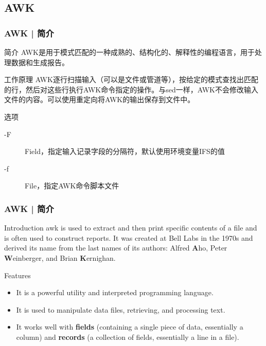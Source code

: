 \subsection{AWK}
\begin{frame}
  \frametitle{AWK | 简介}
  \begin{block}{简介}
    AWK是用于模式匹配的一种成熟的、结构化的、解释性的编程语言，用于处理数据和生成报告。
  \end{block}
  \pause
  \begin{block}{工作原理}
    AWK逐行扫描输入（可以是文件或管道等），按给定的模式查找出匹配的行，然后对这些行执行AWK命令指定的操作。与sed一样，AWK不会修改输入文件的内容。可以使用重定向将AWK的输出保存到文件中。
  \end{block}
  \pause
  \begin{block}{\alert{选项}}
    \begin{description}
      \item[-F] Field，指定输入记录字段的分隔符，默认使用环境变量IFS的值
      \item[-f] File，指定AWK命令脚本文件
    \end{description}
  \end{block}
\end{frame}

\begin{frame}
  \frametitle{AWK | 简介}
  \begin{block}{Introduction}
    awk is used to extract and then print specific contents of a file and is often used to construct reports. It was created at Bell Labs in the 1970s and derived its name from the last names of its authors: Alfred \textbf{A}ho, Peter \textbf{W}einberger, and Brian \textbf{K}ernighan.
  \end{block}
  \pause
  \begin{block}{Features}
    \begin{itemize}
      \item It is a powerful utility and interpreted programming language.
      \item It is used to manipulate data files, retrieving, and processing text.
      \item It works well with \textbf{fields} (containing a single piece of data, essentially a column) and \textbf{records} (a collection of fields, essentially a line in a file).
    \end{itemize}
  \end{block}
\end{frame}

